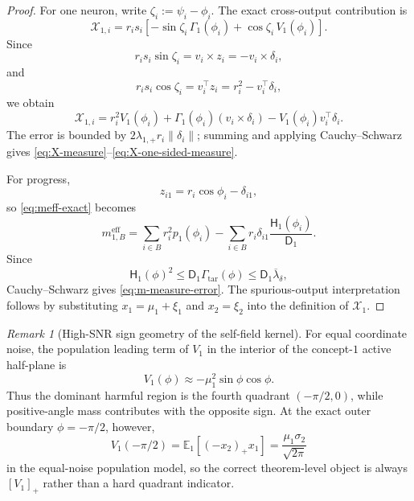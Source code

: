 \documentclass{article} %
\theoremstyle{plain}
\theoremstyle{definition}
\theoremstyle{remark}
\newtheorem{remark}[theorem]{Remark}
\begin{document}
\begin{proof}
For one neuron, write $\zeta_i:=\psi_i-\phi_i$.  The exact cross-output
contribution is
\[
\mathcal X_{1,i}
=
r_is_i
\left[
-\sin\zeta_i\,\Gamma_1(\phi_i)
+\cos\zeta_i\,V_1(\phi_i)
\right].
\]
Since
\[
r_is_i\sin\zeta_i
=v_i\times z_i
=-v_i\times\delta_i,
\]
and
\[
r_is_i\cos\zeta_i
=v_i^\top z_i
=r_i^2-v_i^\top\delta_i,
\]
we obtain
\[
\mathcal X_{1,i}
=
r_i^2V_1(\phi_i)
+
\Gamma_1(\phi_i)(v_i\times\delta_i)
-
V_1(\phi_i)v_i^\top\delta_i.
\]
The error is bounded by
$2\lambda_{1,+}r_i\|\delta_i\|$; summing and applying
Cauchy--Schwarz gives \eqref{eq:X-measure}--\eqref{eq:X-one-sided-measure}.

For progress,
\[
z_{i1}
=r_i\cos\phi_i-\delta_{i1},
\]
so \eqref{eq:meff-exact} becomes
\[
m_{1,B}^{\mathrm{eff}}
=
\sum_{i\in B}r_i^2p_1(\phi_i)
-
\sum_{i\in B}
r_i\delta_{i1}
\frac{\mathsf H_1(\phi_i)}{\mathsf D_1}.
\]
Since
\[
\mathsf H_1(\phi)^2
\le
\mathsf D_1\Gamma_{\mathrm{tar}}(\phi)
\le
\mathsf D_1\overline\lambda_\delta,
\]
Cauchy--Schwarz gives \eqref{eq:m-measure-error}.  The spurious-output
interpretation follows by substituting $x_1=\mu_1+\xi_1$ and $x_2=\xi_2$
into the definition of $\mathcal X_1$.
\end{proof}

\begin{remark}[High-SNR sign geometry of the self-field kernel]
For equal coordinate noise, the population leading term of $V_1$ in the
interior of the concept-$1$ active half-plane is
\[
V_1(\phi)
\approx
-\mu_1^2\sin\phi\cos\phi.
\]
Thus the dominant harmful region is the fourth quadrant
$(-\pi/2,0)$, while positive-angle mass contributes with the opposite sign.
At the exact outer boundary $\phi=-\pi/2$, however,
\[
V_1(-\pi/2)
=
\mathbb E_1[(-x_2)_+x_1]
=
\frac{\mu_1\sigma_2}{\sqrt{2\pi}}
\]
in the equal-noise population model, so the correct theorem-level object is
always $[V_1]_+$ rather than a hard quadrant indicator.
\end{remark}

\end{document}

